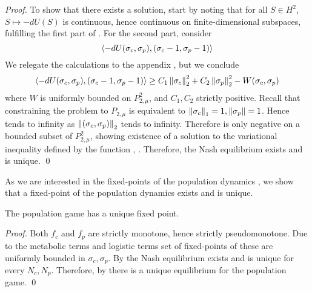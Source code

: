 \begin{proof}
  To show that there exists a solution, start by noting that for all $S\in H^2$, $S\mapsto -dU(S)$ is continuous, hence continuous on finite-dimensional subspaces, fulfilling the first part of . For the second part, consider
  \begin{equation}
    \label{eq:du}
    \left \langle -dU(\sigma_c,\sigma_p),(\sigma_c-1, \sigma_p-1) \right \rangle
  \end{equation}
  We relegate the calculations to the appendix , but we conclude
  \begin{equation}
    \label{eq:fin_exist}
    \left \langle -dU(\sigma_c,\sigma_p),(\sigma_c-1, \sigma_p-1) \right \rangle \geq C_1\left \Vert \sigma_c \right \Vert_2^2 + C_2\left \Vert \sigma_p \right \Vert_2^2 - W(\sigma_c,\sigma_p)
  \end{equation}
  where $W$ is uniformly bounded on $P_{2,\mu}^2$, and $C_1,C_2$ strictly positive. Recall that constraining the problem to $P_{2,\mu}$ is equivalent to $\left \Vert \sigma_c \right \Vert_1 = 1, \left \Vert \sigma_p \right \Vert = 1$. Hence  tends to infinity as $\left \Vert (\sigma_c,\sigma_p) \right \Vert_2$ tends to infinity. Therefore  is only negative on a bounded subset of $P^2_{2,\mu}$, showing existence of a solution to the variational inequality defined by the function , . Therefore, the Nash equilibrium exists and is unique.
  \qed
\end{proof}
As we are interested in the fixed-points of the population dynamics , we show that a fixed-point of the population dynamics exists and is unique.
\begin{corollary}
  The population game  has a unique fixed point.
\end{corollary}
\begin{proof}
Both $f_c$ and $f_p$ are strictly monotone, hence strictly pseudomonotone. Due to the metabolic terms and logistic terms set of fixed-points of these are uniformly bounded in $\sigma_c, \sigma_p$. By  the Nash equilibrium exists and is unique for every $N_c, N_p$. Therefore, by  there is a unique equilibrium for the population game.%
\qed
\end{proof}

